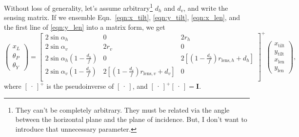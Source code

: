 Without loss of generality, let's assume arbitrary\footnote{They can't be completely arbitrary. They must be related via the angle between the horizontal plane and the plane of incidence. But, I don't want to introduce that unnecessary parameter.} $d_h$ and $d_v$, and write the sensing matrix.
If we ensemble Eqn.~\eqref{eqn:x_tilt}, \eqref{eqn:y_tilt}, \eqref{eqn:x_len}, and the first line of \eqref{eqn:y_len} into a matrix form, we get
\begin{equation}
	\begin{pmatrix}
		x_L\\
		\theta_P\\
		\theta_Y
	\end{pmatrix}
	=
	\begin{bmatrix}
		2\sin\alpha_h & 0 & 2r_h\\
		2\sin\alpha_v & 2r_v & 0\\
		2\sin\alpha_h\left(1-\frac{d_h}{f}\right) & 0 & 2\left[\left(1-\frac{d_h}{f}\right)r_{\mathrm{lens},h}+d_h\right]\\
		2\sin\alpha_v\left(1-\frac{d_v}{f}\right) &  2\left[\left(1-\frac{d_v}{f}\right)r_{\mathrm{lens},v}+d_v\right] & 0\\
	\end{bmatrix}^{+}
	\begin{pmatrix}
		x_\mathrm{tilt}\\
		y_\mathrm{tilt}\\
		x_\mathrm{len}\\
		y_\mathrm{len}
	\end{pmatrix},
	\label{eqn:sensing_matrix_general}
\end{equation}
where $\begin{bmatrix}\cdot\end{bmatrix}^{+}$ is the pseudoinverse of $\begin{bmatrix}\cdot\end{bmatrix}$, and $\begin{bmatrix}\cdot\end{bmatrix}^{+}\begin{bmatrix}\cdot\end{bmatrix}=\mathbf{I}$.

